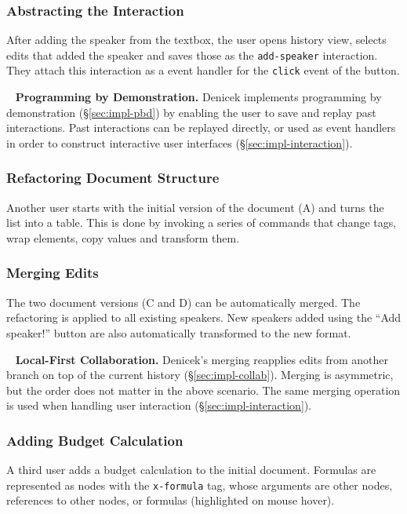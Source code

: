 \documentclass[sigconf,anonymous,screen]{acmart}
\newcommand*\circled[1]{\textnormal{\footnotesize\sffamily\bfseries\protect\tikz[baseline=(char.base)]{
  \node[shape=circle,fill=black,text=white,draw,inner sep=1pt] (char) {#1};}}}
\DeclareRobustCommand{\keyideabox}[3]{\begin{tcolorbox}[breakable,
  boxsep=5pt,left=0pt,right=0pt,top=0pt,bottom=0pt,width=\dimexpr\columnwidth\relax,
  colback=gray!20,colframe=gray!20,
  enlarge bottom by=0pt,enlarge top by=0pt,
  arc=0pt,outer arc=0pt]
\lettrine[lraise=0.3]{\LARGE #1}{~}
\small \textbf{#2.} #3
\end{tcolorbox}
}
\begin{document}
\subsubsection*{\circled{C} Abstracting the Interaction} After adding the speaker from the textbox,
the user opens history view, selects edits that added the speaker and saves those as the
{\small\Verb_add-speaker_} interaction. They attach this interaction as a event handler for the
{\small\Verb_click_} event of the button.

\keyideabox{\faLightbulbO}{Programming by Demonstration}{Denicek implements programming by
demonstration (\S\ref{sec:impl-pbd}) by enabling the user to save and replay past interactions.
Past interactions can be replayed directly, or used as event handlers in order to construct interactive user
interfaces (\S\ref{sec:impl-interaction}).}

\subsubsection*{\circled{D} Refactoring Document Structure} Another user starts with the initial
version of the document (A) and turns the list into a table. This is done by invoking a series of
commands that change tags, wrap elements, copy values and transform them.

\subsubsection*{\circled{E} Merging Edits} The two document versions (C and D) can be automatically merged.
The refactoring is applied to all existing speakers. New speakers added using the ``Add speaker!''
button are also automatically transformed to the new format.

\keyideabox{\faLightbulbO}{Local-First Collaboration}{Denicek's merging
reapplies edits from another branch on top of the current history (\S\ref{sec:impl-collab}).
Merging is asymmetric, but the order does not matter in the above scenario. The same merging
operation is used when handling user interaction (\S\ref{sec:impl-interaction}).}

\subsubsection*{\circled{F} Adding Budget Calculation} A third user adds a budget calculation to
the initial document. Formulas are represented as nodes with the {\small\Verb_x-formula_} tag,
whose arguments are other nodes, references to other nodes, or formulas (highlighted on mouse hover).
\end{document}
